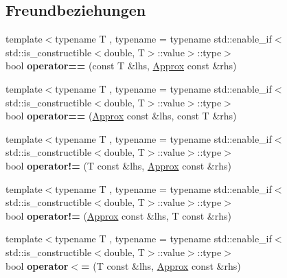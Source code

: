 \subsection*{Freundbeziehungen}
\begin{DoxyCompactItemize}
\item 
\mbox{\label{classCatch_1_1Detail_1_1Approx_ab38782a37d09b527ca5e126dbf433dda}} 
{\footnotesize template$<$typename T , typename  = typename std\+::enable\+\_\+if$<$std\+::is\+\_\+constructible$<$double, T$>$\+::value$>$\+::type$>$ }\\bool {\bfseries operator==} (const T \&lhs, \hyperlink{classCatch_1_1Detail_1_1Approx}{Approx} const \&rhs)
\item 
\mbox{\label{classCatch_1_1Detail_1_1Approx_a0e5ef1957d4c38d7857005909c613743}} 
{\footnotesize template$<$typename T , typename  = typename std\+::enable\+\_\+if$<$std\+::is\+\_\+constructible$<$double, T$>$\+::value$>$\+::type$>$ }\\bool {\bfseries operator==} (\hyperlink{classCatch_1_1Detail_1_1Approx}{Approx} const \&lhs, const T \&rhs)
\item 
\mbox{\label{classCatch_1_1Detail_1_1Approx_a29696f14ebd51887c8c88e771d12ef54}} 
{\footnotesize template$<$typename T , typename  = typename std\+::enable\+\_\+if$<$std\+::is\+\_\+constructible$<$double, T$>$\+::value$>$\+::type$>$ }\\bool {\bfseries operator!=} (T const \&lhs, \hyperlink{classCatch_1_1Detail_1_1Approx}{Approx} const \&rhs)
\item 
\mbox{\label{classCatch_1_1Detail_1_1Approx_a31d62e3c35abb86cf25e02601966ca5d}} 
{\footnotesize template$<$typename T , typename  = typename std\+::enable\+\_\+if$<$std\+::is\+\_\+constructible$<$double, T$>$\+::value$>$\+::type$>$ }\\bool {\bfseries operator!=} (\hyperlink{classCatch_1_1Detail_1_1Approx}{Approx} const \&lhs, T const \&rhs)
\item 
\mbox{\label{classCatch_1_1Detail_1_1Approx_a0369de03e81bc2ceaf6c9d830476bd49}} 
{\footnotesize template$<$typename T , typename  = typename std\+::enable\+\_\+if$<$std\+::is\+\_\+constructible$<$double, T$>$\+::value$>$\+::type$>$ }\\bool {\bfseries operator$<$=} (T const \&lhs, \hyperlink{classCatch_1_1Detail_1_1Approx}{Approx} const \&rhs)

\end{DoxyCompactItemize}
